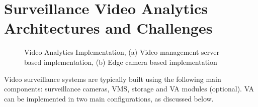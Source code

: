 \section{Surveillance Video Analytics Architectures and Challenges}
\begin{figure}
\centering
{}
\caption{Video Analytics Implementation, (a) Video management server based implementation, (b) Edge camera based implementation}
\label{fig:va_arch}
\end{figure}
Video surveillance systems are typically built using the following main components: surveillance cameras, VMS, storage and VA modules (optional). VA can be implemented in two main configurations, as discussed below.
